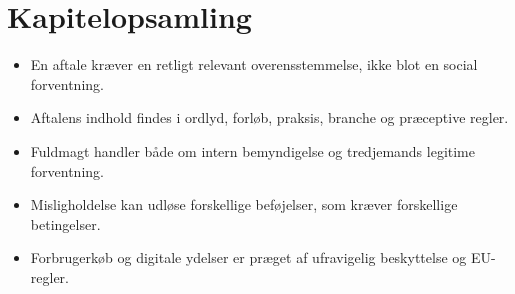 \section*{Kapitelopsamling}
\begin{itemize}
  \item En aftale kræver en retligt relevant overensstemmelse, ikke blot en social forventning.
  \item Aftalens indhold findes i ordlyd, forløb, praksis, branche og præceptive regler.
  \item Fuldmagt handler både om intern bemyndigelse og tredjemands legitime forventning.
  \item Misligholdelse kan udløse forskellige beføjelser, som kræver forskellige betingelser.
  \item Forbrugerkøb og digitale ydelser er præget af ufravigelig beskyttelse og EU-regler.
\end{itemize}
